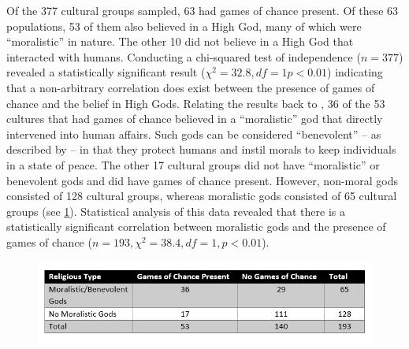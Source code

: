 \documentclass[%
	]{ijsra}
\begin{document}
Of the 377 cultural groups sampled, 63 had games of chance present. Of these 63 populations, 53 of them also believed in a High God, many of which were ``moralistic” in nature. The other 10 did not believe in a High God that interacted with humans. Conducting a chi-squared test of independence ($n = 377$) revealed a statistically significant result ($\chi^{2} = 32.8, df = 1 p < 0.01$) indicating that a non-arbitrary correlation does exist between the presence of games of chance and the belief in High Gods. Relating the results back to \textcite{roberts1959}, 36 of the 53 cultures that had games of chance believed in a ``moralistic” god that directly intervened into human affairs. Such gods can be considered ``benevolent” – as described by \textcite{lambert1959} – in that they protect humans and instil morals to keep individuals in a state of peace. The other 17 cultural groups did not have ``moralistic” or benevolent gods and did have games of chance present. However, non-moral gods consisted of 128 cultural groups, whereas moralistic gods consisted of 65 cultural groups (see \cref{fig:Davis-Table02}). Statistical analysis of this data revealed that there is a statistically significant correlation between moralistic gods and the presence of games of chance ($n = 193, \chi^{2} = 38.4, df = 1, p < 0.01$).

\begin{figure}[!htb] %
	\includegraphics[width=\linewidth]{figures/Davis-Table02}
	\centering
	\label{fig:Davis-Table02}
\end{figure}

\end{document}
